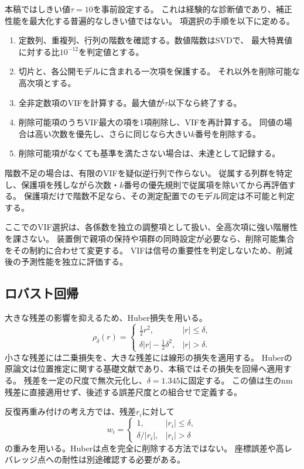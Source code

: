 \documentclass[11pt,a4paper]{ltjsarticle}
\begin{document}
本稿ではしきい値$\tau=10$を事前設定する。
これは経験的な診断値であり、補正性能を最大化する普遍的なしきい値ではない。
項選択の手順を以下に定める。
\begin{enumerate}
 \item 定数列、重複列、行列の階数を確認する。数値階数はSVDで、
 最大特異値に対する比$10^{-12}$を判定値とする。
 \item 切片と、各公開モデルに含まれる一次項を保護する。
 それ以外を削除可能な高次項とする。
 \item 全非定数項のVIFを計算する。最大値が$\tau$以下なら終了する。
 \item 削除可能項のうちVIF最大の項を1項削除し、VIFを再計算する。
 同値の場合は高い次数を優先し、さらに同じなら大きい$k$番号を削除する。
 \item 削除可能項がなくても基準を満たさない場合は、未達として記録する。
\end{enumerate}
階数不足の場合は、有限のVIFを疑似逆行列で作らない。
従属する列群を特定し、保護項を残しながら次数・$k$番号の優先規則で従属項を除いてから再評価する。
保護項だけで階数不足なら、その測定配置でのモデル同定は不可能と判定する。

ここでのVIF選択は、各係数を独立の調整項として扱い、全高次項に強い階層性を課さない。
装置側で親項の保持や項群の同時設定が必要なら、削除可能集合をその制約に合わせて変更する。
VIFは信号の重要性を判定しないため、削減後の予測性能を独立に評価する。

\subsection{ロバスト回帰}
大きな残差の影響を抑えるため、Huber損失\cite{huber1964}を用いる。
\begin{equation}
 \rho_\delta(r)=
 \begin{cases}
  \frac12r^2, & |r|\leq\delta,\\
  \delta|r|-\frac12\delta^2, & |r|>\delta.
 \end{cases}
 \label{eq:huber}
\end{equation}
小さな残差には二乗損失を、大きな残差には線形の損失を適用する。
Huberの原論文は位置推定に関する基礎文献であり、本稿ではその損失を回帰へ適用する。
残差を一定の尺度で無次元化し、$\delta=1.345$に固定する。
この値は生のnm残差に直接適用せず、後述する誤差尺度との組合せで定義する。

反復再重み付けの考え方では、残差$r_i$に対して
\begin{equation}
 w_i=
 \begin{cases}1,& |r_i|\leq\delta,\\
 \delta/|r_i|,& |r_i|>\delta
 \end{cases}
 \label{eq:weight}
\end{equation}
の重みを用いる。Huberは点を完全に削除する方法ではない。
座標誤差や高レバレッジ点への耐性は別途確認する必要がある。
\end{document}
